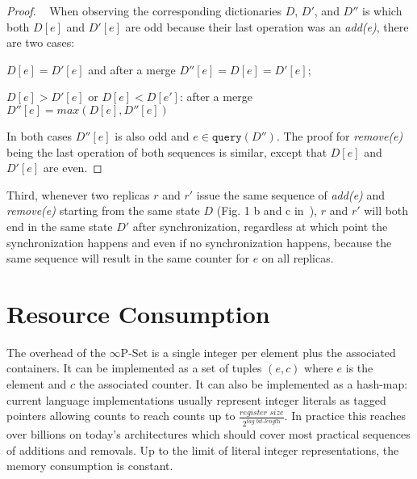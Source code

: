 \documentclass[11pt, oneside]{article}   	%
\begin{document}
\begin{proof}


	\pf~ When observing the corresponding dictionaries $D$, $D'$, and $D''$ is which both $D[e]$ and $D'[e]$ are odd because their last operation was an \textit{add(e)}, there are two cases:
	\begin{pfenum}
    		\item $D[e]=D'[e]$ and after a merge $D''[e]=D[e]=D'[e]$;
    		\item $D[e]>D'[e]$ or $D[e]<D[e']$: after a merge $D''[e]=max(D[e], D''[e])$
	\end{pfenum}   

	In both cases $D''[e]$ is also odd and $e \in  \texttt{query}(D'')$.  The proof for \textit{remove(e)} being the last operation of both sequences is similar, except that $D[e]$ and $D'[e]$ are even.

\end{proof}

Third, whenever two replicas $r$ and $r'$ issue the same sequence of \textit{add(e)} and \textit{remove(e)} starting from the same state $D$ (Fig. 1 b and c in~\cite{bieniusa:hal-00769554}), $r$ and $r'$ will both end in the same state $D'$ after synchronization, regardless at which point the synchronization happens and even if no synchronization happens, because the same sequence will result in the same counter for $e$ on all replicas.

\section{Resource Consumption}
\label{sec:resource-consumption}

The overhead of the $\infty$P-Set is a single integer per element plus the associated containers. It can be implemented as a set of tuples $(e,c)$ where $e$ is the element and $c$ the associated counter. It can also be implemented as a hash-map: current language implementations usually represent integer literals as tagged pointers allowing counts to reach counts up to 
$\frac{\textit{register size}}{2^\textit{tag bit-length}}$. In practice this reaches over billions on today's architectures which should cover most practical sequences of additions and removals. Up to the limit of literal integer representations, the memory consumption is constant.
\end{document}

